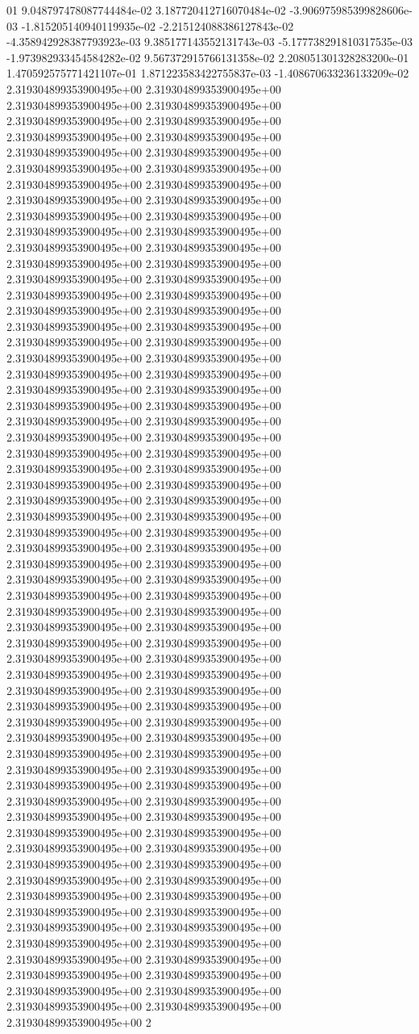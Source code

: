 01	9.048797478087744484e-02	3.187720412716070484e-02	-3.906975985399828606e-03	-1.815205140940119935e-02	-2.215124088386127843e-02	-4.358942928387793923e-03	9.385177143552131743e-03	-5.177738291810317535e-03	-1.973982933454584282e-02	9.567372915766131358e-02	2.208051301328283200e-01	1.470592575771421107e-01	1.871223583422755837e-03	-1.408670633236133209e-02
2.319304899353900495e+00	2.319304899353900495e+00	2.319304899353900495e+00	2.319304899353900495e+00	2.319304899353900495e+00	2.319304899353900495e+00	2.319304899353900495e+00	2.319304899353900495e+00	2.319304899353900495e+00	2.319304899353900495e+00	2.319304899353900495e+00	2.319304899353900495e+00	2.319304899353900495e+00	2.319304899353900495e+00	2.319304899353900495e+00	2.319304899353900495e+00	2.319304899353900495e+00	2.319304899353900495e+00	2.319304899353900495e+00	2.319304899353900495e+00	2.319304899353900495e+00	2.319304899353900495e+00	2.319304899353900495e+00	2.319304899353900495e+00	2.319304899353900495e+00	2.319304899353900495e+00	2.319304899353900495e+00	2.319304899353900495e+00	2.319304899353900495e+00	2.319304899353900495e+00	2.319304899353900495e+00	2.319304899353900495e+00	2.319304899353900495e+00	2.319304899353900495e+00	2.319304899353900495e+00	2.319304899353900495e+00	2.319304899353900495e+00	2.319304899353900495e+00	2.319304899353900495e+00	2.319304899353900495e+00	2.319304899353900495e+00	2.319304899353900495e+00	2.319304899353900495e+00	2.319304899353900495e+00	2.319304899353900495e+00	2.319304899353900495e+00	2.319304899353900495e+00	2.319304899353900495e+00	2.319304899353900495e+00	2.319304899353900495e+00	2.319304899353900495e+00	2.319304899353900495e+00	2.319304899353900495e+00	2.319304899353900495e+00	2.319304899353900495e+00	2.319304899353900495e+00	2.319304899353900495e+00	2.319304899353900495e+00	2.319304899353900495e+00	2.319304899353900495e+00	2.319304899353900495e+00	2.319304899353900495e+00	2.319304899353900495e+00	2.319304899353900495e+00	2.319304899353900495e+00	2.319304899353900495e+00	2.319304899353900495e+00	2.319304899353900495e+00	2.319304899353900495e+00	2.319304899353900495e+00	2.319304899353900495e+00	2.319304899353900495e+00	2.319304899353900495e+00	2.319304899353900495e+00	2.319304899353900495e+00	2.319304899353900495e+00	2.319304899353900495e+00	2.319304899353900495e+00	2.319304899353900495e+00	2.319304899353900495e+00	2.319304899353900495e+00	2.319304899353900495e+00	2.319304899353900495e+00	2.319304899353900495e+00	2.319304899353900495e+00	2.319304899353900495e+00	2.319304899353900495e+00	2.319304899353900495e+00	2.319304899353900495e+00	2.319304899353900495e+00	2.319304899353900495e+00	2.319304899353900495e+00	2.319304899353900495e+00	2.319304899353900495e+00	2.319304899353900495e+00	2.319304899353900495e+00	2.319304899353900495e+00	2.319304899353900495e+00	2.319304899353900495e+00	2.319304899353900495e+00	2.319304899353900495e+00	2.319304899353900495e+00	2.319304899353900495e+00	2.319304899353900495e+00	2.319304899353900495e+00	2.319304899353900495e+00	2.319304899353900495e+00	2.319304899353900495e+00	2.319304899353900495e+00	2.319304899353900495e+00	2.319304899353900495e+00	2.319304899353900495e+00	2.319304899353900495e+00	2.319304899353900495e+00	2.319304899353900495e+00	2.319304899353900495e+00	2.319304899353900495e+00	2.319304899353900495e+00	2.319304899353900495e+00	2